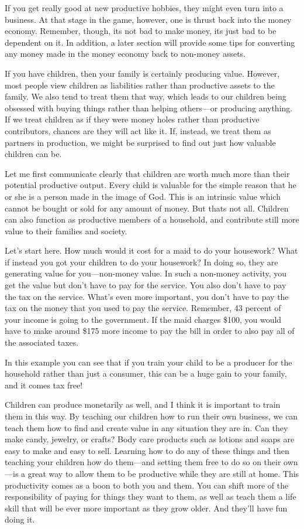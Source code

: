 If you get really good at new productive hobbies, they might even turn
into a business. At that stage in the game, however, one is thrust back
into the money economy.  Remember, though, it{\textquotesingle}s not
bad to make money, it{\textquotesingle}s just bad to be dependent on
it.  In addition, a later section will provide some tips for converting
any money made in the money economy back to non-money assets. 

If you have children, then your family is certainly producing value.
However, most people view children as liabilities rather than
productive assets to the family. We also tend to treat them that way,
which leads to our children being obsessed with buying things rather
than helping others—or
producing anything. If we treat
children as if they
were money holes rather than productive contributors, chances are they
will act like it. If, instead, we treat them as partners in production,
we might be surprised to find out just how valuable children can be. 

Let me first
communicate clearly that children are worth
much more than their
potential productive output. Every child is valuable for the simple
reason that he or she is a person made in the image of God.  This is an
intrinsic value which cannot be bought or sold for any amount of money.
 But that{\textquotesingle}s not all.  Children can also function as
productive members of a  household, and contribute still more value to
their families and society.

Let’s start here. How
much would it cost for a maid to do your housework?  What if
instead you got your
children to do your housework?  In doing so, they are generating value
for you—non-money value. In such a non-money activity, you get the
value but don’t have to pay for the service. You also don’t have to pay
the tax on the service.
What’s even more
important, you don’t have to pay the tax on the money that you used to
pay the service. Remember, 43 percent of your income is going to the
government. If the maid charges \$100, you would have to make around
\$175 more income to pay the bill in order to also pay all of the
associated taxes.

In this example you
can see that if you train your child to be a producer for the household
rather than just a consumer, this can be a huge gain to your family,
and it comes tax free!

Children can produce monetarily as well, and I think it is important to
train them in this way. By teaching our children how to run their own
business, we can teach them how to find and create value in any
situation they are in. Can they make candy, jewelry, or crafts?  Body
care products such as lotions and soaps are easy to make and easy to
sell. Learning how to
do any of these things and then teaching your children how do them—and
setting them free to do so on their own—is a great way to allow them
to be productive while they are still
at home. This
productivity comes as a boon to both you and them. You can shift more
of the responsibility of paying for things they want to them, as well
as teach them a life skill that will be ever more important as they
grow older. And
they’ll have fun doing it.

